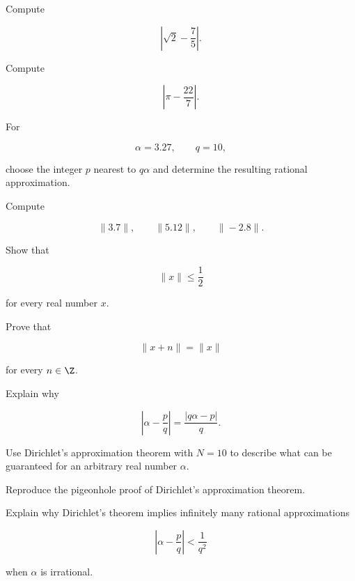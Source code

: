 \begin{exercise}[1]
Compute

\[ \left|\sqrt2-\frac75\right|. \]
\end{exercise}

\begin{exercise}[1]
Compute

\[ \left|\pi-\frac{22}{7}\right|. \]
\end{exercise}

\begin{exercise}[1]
For

\[ \alpha=3.27,\qquad q=10, \]

choose the integer \(p\) nearest to \(q\alpha\) and determine the resulting
rational approximation.
\end{exercise}

\begin{exercise}[1]
Compute

\[ \|3.7\|,\qquad\|5.12\|,\qquad\|-2.8\|. \]
\end{exercise}

\begin{exercise}[2]
Show that

\[ \|x\|\leq\frac12 \]

for every real number \(x\).
\end{exercise}

\begin{exercise}[2]
Prove that

\[ \|x+n\|=\|x\| \]

for every \(n\in\Z\).
\end{exercise}

\begin{exercise}[2]
Explain why

\[ \left|\alpha-\frac pq\right|=\frac{|q\alpha-p|}{q}. \]
\end{exercise}

\begin{exercise}[2]
Use Dirichlet's approximation theorem with \(N=10\) to describe what can be
guaranteed for an arbitrary real number \(\alpha\).
\end{exercise}

\begin{exercise}[3]
Reproduce the pigeonhole proof of Dirichlet's approximation theorem.
\end{exercise}

\begin{exercise}[2]
Explain why Dirichlet's theorem implies infinitely many rational
approximations

\[ \left|\alpha-\frac pq\right|<\frac1{q^2} \]

when \(\alpha\) is irrational.
\end{exercise}

